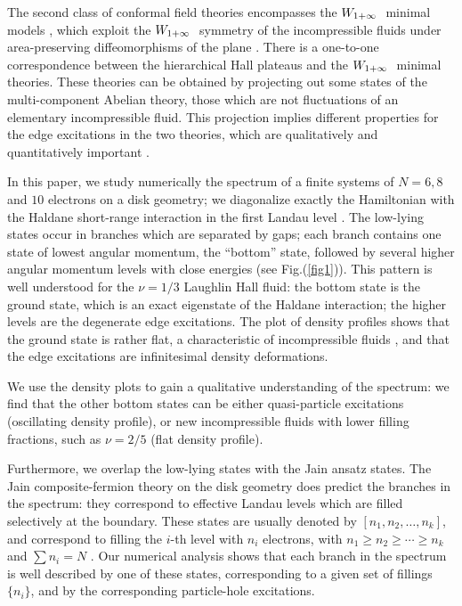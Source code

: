 The second class of conformal field theories encompasses the $W_{1+\infty}\ $ 
minimal models \cite{ctz5}, which exploit the $W_{1+\infty}\ $ symmetry of the 
incompressible fluids under area-preserving diffeomorphisms of the 
plane \cite{sakita}\cite{ctz1}\cite{ctz3}.
There is a one-to-one correspondence between the hierarchical Hall plateaus
and the $W_{1+\infty}\ $ minimal theories.
These theories can be obtained by
projecting out some states of the multi-component Abelian theory,
those which are not fluctuations of an elementary incompressible fluid.
This projection implies different properties for 
the edge excitations in the two theories,
which are qualitatively and quantitatively important \cite{ctz5}.

\bigskip

In this paper, we study numerically the spectrum of a finite
systems of $N=6,8$ and $10$ electrons on a disk geometry;
we diagonalize exactly the Hamiltonian with the Haldane short-range 
interaction in the first Landau level \cite{hald}. 
The low-lying states occur in branches which are separated by gaps; 
each branch contains
one state of lowest angular momentum, the ``bottom'' state, 
followed by several higher angular momentum levels with close energies
(see Fig.(\ref{fig1})).
This pattern is well understood for the $\nu=1/3$ Laughlin Hall fluid:
the bottom state is the ground state,
which is an exact eigenstate of the Haldane interaction;
the higher levels are the degenerate edge excitations.
The plot of density profiles shows that the ground state is rather
flat, a characteristic of incompressible fluids \cite{laugh}, and that 
the edge excitations are infinitesimal density deformations.

We use the density plots to gain a qualitative understanding of the 
spectrum: we find that the other bottom states can be either quasi-particle 
excitations (oscillating density profile), or new 
incompressible fluids with lower filling fractions, 
such as $\nu=2/5$ (flat density profile).

Furthermore, we overlap the low-lying states with the Jain ansatz states.
The Jain composite-fermion theory on the disk geometry does predict
the branches in the spectrum: they correspond to
effective Landau levels which are filled selectively at the boundary.
These states are usually denoted by  $[n_1,n_2,\dots,n_k]$, and 
correspond to filling the $i$-th level with $n_i$ electrons, with
$n_1 \ge n_2 \ge \cdots \ge n_k$ and $\sum n_i =N$ \cite{jain}.
Our numerical analysis shows that each branch in the spectrum is
well described by one of these states, corresponding to a given set of 
fillings $\{n_i\}$, and by the corresponding particle-hole excitations.

